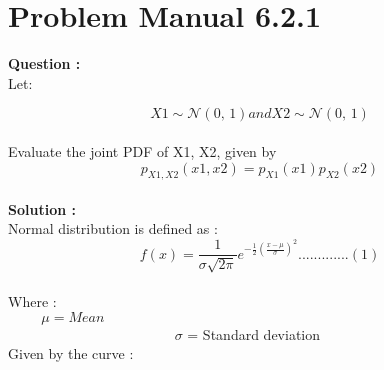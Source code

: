 \documentclass{article}
\begin{document}

\section{Problem Manual 6.2.1}
\textbf{Question :} \\
Let:

  $$X1 \sim \mathcal{N}(0,\,1) and X2 \sim \mathcal{N}(0,\,1)$$
 \\
Evaluate the joint PDF of X1, X2, given by \\
$$p_{X1,X2}(x1,x2) = p_{X1}(x1)p_{X2}(x2)$$ \\
\textbf{Solution :} \\
Normal distribution is defined as : \\
 $$f(x)={\frac {1}{\sigma {\sqrt {2\pi }}}}e^{-{\frac {1}{2}}\left({\frac {x - \mu }{\sigma }}\right)^{2}}.............(1)$$ \\
 

Where :\\
$\hspace{1cm} \mu = Mean$\\
$\hspace{5cm} \sigma$ = Standard deviation \\
Given by the curve :\\
\end{document}
